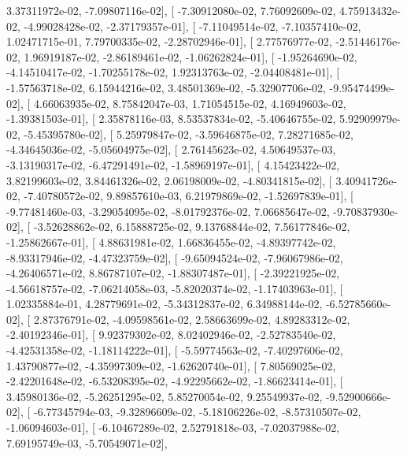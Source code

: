 \documentclass{article}
\begin{document}
          3.37311972e-02,  -7.09807116e-02],
       [ -7.30912080e-02,   7.76092609e-02,   4.75913432e-02,
         -4.99028428e-02,  -2.37179357e-01],
       [ -7.11049514e-02,  -7.10357410e-02,   1.02471715e-01,
          7.79700335e-02,  -2.28702946e-01],
       [  2.77576977e-02,  -2.51446176e-02,   1.96919187e-02,
         -2.86189461e-02,  -1.06262824e-01],
       [ -1.95264690e-02,  -4.14510417e-02,  -1.70255178e-02,
          1.92313763e-02,  -2.04408481e-01],
       [ -1.57563718e-02,   6.15944216e-02,   3.48501369e-02,
         -5.32907706e-02,  -9.95474499e-02],
       [  4.66063935e-02,   8.75842047e-03,   1.71054515e-02,
          4.16949603e-02,  -1.39381503e-01],
       [  2.35878116e-03,   8.53537834e-02,  -5.40646755e-02,
          5.92909979e-02,  -5.45395780e-02],
       [  5.25979847e-02,  -3.59646875e-02,   7.28271685e-02,
         -4.34645036e-02,  -5.05604975e-02],
       [  2.76145623e-02,   4.50649537e-03,  -3.13190317e-02,
         -6.47291491e-02,  -1.58969197e-01],
       [  4.15423422e-02,   3.82199603e-02,   3.84461326e-02,
          2.06198009e-02,  -4.80341815e-02],
       [  3.40941726e-02,  -7.40780572e-02,   9.89857610e-03,
          6.21979869e-02,  -1.52697839e-01],
       [ -9.77481460e-03,  -3.29054095e-02,  -8.01792376e-02,
          7.06685647e-02,  -9.70837930e-02],
       [ -3.52628862e-02,   6.15888725e-02,   9.13768844e-02,
          7.56177846e-02,  -1.25862667e-01],
       [  4.88631981e-02,   1.66836455e-02,  -4.89397742e-02,
         -8.93317946e-02,  -4.47323759e-02],
       [ -9.65094524e-02,  -7.96067986e-02,  -4.26406571e-02,
          8.86787107e-02,  -1.88307487e-01],
       [ -2.39221925e-02,  -4.56618757e-02,  -7.06214058e-03,
         -5.82020374e-02,  -1.17403963e-01],
       [  1.02335884e-01,   4.28779691e-02,  -5.34312837e-02,
          6.34988144e-02,  -6.52785660e-02],
       [  2.87376791e-02,  -4.09598561e-02,   2.58663699e-02,
          4.89283312e-02,  -2.40192346e-01],
       [  9.92379302e-02,   8.02402946e-02,  -2.52783540e-02,
         -4.42531358e-02,  -1.18114222e-01],
       [ -5.59774563e-02,  -7.40297606e-02,   1.43790877e-02,
         -4.35997309e-02,  -1.62620740e-01],
       [  7.80569025e-02,  -2.42201648e-02,  -6.53208395e-02,
         -4.92295662e-02,  -1.86623414e-01],
       [  3.45980136e-02,  -5.26251295e-02,   5.85270054e-02,
          9.25549937e-02,  -9.52900666e-02],
       [ -6.77345794e-03,  -9.32896609e-02,  -5.18106226e-02,
         -8.57310507e-02,  -1.06094603e-01],
       [ -6.10467289e-02,   2.52791818e-03,  -7.02037988e-02,
          7.69195749e-03,  -5.70549071e-02],
\end{document}
